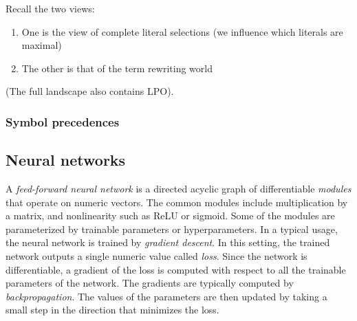 Recall the two views:
\begin{enumerate}
\item
	One is the view of complete literal selections (we influence which literals are maximal)

\item
	The other is that of the term rewriting world

\end{enumerate}
(The full landscape also contains LPO).




\subsubsection{Symbol precedences}


\subsection{Neural networks}

A \emph{feed-forward neural network} is a directed acyclic graph
of differentiable \emph{modules} that operate on numeric vectors.
The common modules include multiplication by a matrix, and nonlinearity such as ReLU or sigmoid.
Some of the modules are parameterized by trainable parameters or hyperparameters.
In a typical usage, the neural network is trained by \emph{gradient descent}.
In this setting, the trained network outputs a single numeric value called \emph{loss}.
Since the network is differentiable,
a gradient of the loss is computed with respect to all the trainable parameters of the network.
The gradients are typically computed by \emph{backpropagation}.
The values of the parameters are then updated by taking a small step in the direction that minimizes the loss.

